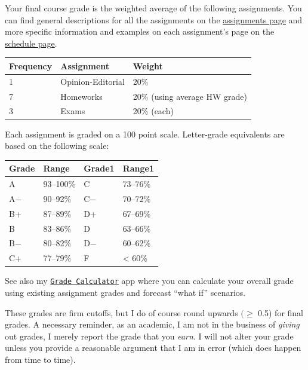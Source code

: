 \documentclass{article}
\begin{document}
Your final course grade is the weighted average of the following
assignments. You can find general descriptions for all the assignments
on the
\href{http://microF20.classes.ryansafner.com/assignments/}{assignments
page} and more specific information and examples on each assignment's
page on the
\href{http://microF20.classes.ryansafner.com/schedule/}{schedule page}.

\begin{center}

\begin{tabular}{lll}
\toprule
Frequency & Assignment & Weight\\
\midrule
1 & Opinion-Editorial & 20\%\\
7 & Homeworks & 20\% (using average HW grade)\\
3 & Exams & 20\% (each)\\
\bottomrule
\end{tabular}
\end{center}

Each assignment is graded on a 100 point scale. Letter-grade equivalents
are based on the following scale:

\begin{center}

\begin{tabular}{llll}
\toprule
Grade & Range & Grade1 & Range1\\
\midrule
A & 93–100\% & C & 73–76\%\\
A− & 90–92\% & C− & 70–72\%\\
B+ & 87–89\% & D+ & 67–69\%\\
B & 83–86\% & D & 63–66\%\\
B− & 80–82\% & D− & 60–62\%\\
\addlinespace
C+ & 77–79\% & F & < 60\%\\
\bottomrule
\end{tabular}
\end{center}

See also my
\href{https://ryansafner.shinyapps.io/306_grade_calculator/}{
\texttt{Grade\ Calculator}} app where you can calculate your overall
grade using existing assignment grades and forecast ``what if''
scenarios.

These grades are firm cutoffs, but I do of course round upwards
\((\geq\) 0.5) for final grades. A necessary reminder, as an academic, I
am not in the business of \emph{giving} out grades, I merely report the
grade that you \emph{earn}. I will not alter your grade unless you
provide a reasonable argument that I am in error (which does happen from
time to time).
\end{document}
